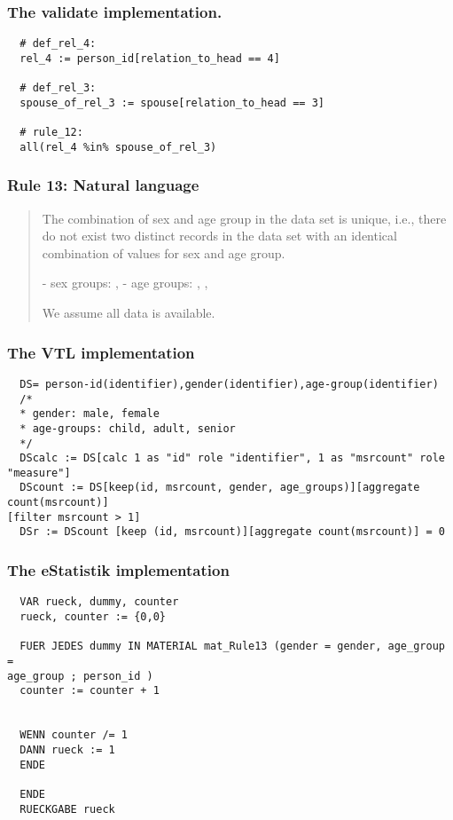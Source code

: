 \subsubsection*{The validate implementation.}
\begin{verbatim}
  # def_rel_4:
  rel_4 := person_id[relation_to_head == 4]

  # def_rel_3:
  spouse_of_rel_3 := spouse[relation_to_head == 3]

  # rule_12:
  all(rel_4 %in% spouse_of_rel_3)
\end{verbatim}


\newpage

\subsubsection*{  Rule 13: Natural language}
\begin{quote}


The combination of sex and age group in the data set is unique, i.e., there do not exist two distinct records in
the data set with an identical combination of values for sex and age group.

- sex groups: , 
- age groups: , ,  

We assume all data is available.


\end{quote}
\subsubsection*{The VTL implementation}
\begin{verbatim}
  DS= person-id(identifier),gender(identifier),age-group(identifier)
  /*
  * gender: male, female
  * age-groups: child, adult, senior
  */
  DScalc := DS[calc 1 as "id" role "identifier", 1 as "msrcount" role "measure"]
  DScount := DS[keep(id, msrcount, gender, age_groups)][aggregate count(msrcount)]
[filter msrcount > 1]
  DSr := DScount [keep (id, msrcount)][aggregate count(msrcount)] = 0
\end{verbatim}
\subsubsection*{The eStatistik implementation}
\begin{verbatim}
  VAR rueck, dummy, counter
  rueck, counter := {0,0}

  FUER JEDES dummy IN MATERIAL mat_Rule13 (gender = gender, age_group =
age_group ; person_id )
  counter := counter + 1


  WENN counter /= 1
  DANN rueck := 1
  ENDE

  ENDE
  RUECKGABE rueck
\end{verbatim}
